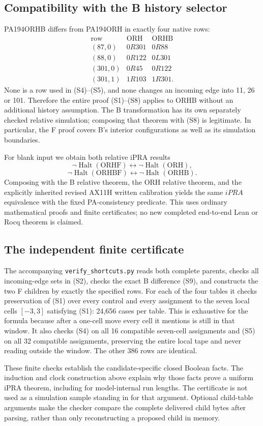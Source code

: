 \subsection{Compatibility with the B history selector}

PA194ORHB differs from PA194ORH in exactly four native rows:
\[
\begin{array}{c|c|c}
\text{row}&\text{ORH}&\text{ORHB}\\\hline
(87,0)&0R301&0R88\\
(88,0)&0R122&0L301\\
(301,0)&0R45&0R122\\
(301,1)&1R103&1R301.
\end{array}                                                    \tag{S9}
\]
None is a row used in (S4)--(S5), and none changes an incoming edge into
11, 26 or 101.  Therefore the entire proof (S1)--(S8) applies to ORHB
without an additional history assumption.  The B transformation has its
own separately checked relative simulation; composing that theorem with
(S8) is legitimate.  In particular, the F proof covers B's interior
configurations as well as its simulation boundaries.

For blank input we obtain both relative iPRA results
\[
 \neg\operatorname{Halt}(\mathrm{ORHF})
       \longleftrightarrow\neg\operatorname{Halt}(\mathrm{ORH}),
\]
\[
 \neg\operatorname{Halt}(\mathrm{ORHBF})
       \longleftrightarrow\neg\operatorname{Halt}(\mathrm{ORHB}).
\]
Composing with the B relative theorem, the ORH relative theorem, and the
explicitly inherited revised AX11H written calibration yields the same
$iPRA$ equivalence with the fixed PA-consistency predicate.  This uses
ordinary mathematical proofs and finite certificates; no new completed
end-to-end Lean or Rocq theorem is claimed.

\subsection{The independent finite certificate}

The accompanying \texttt{verify\_shortcuts.py} reads both complete parents,
checks all incoming-edge sets in (S2), checks the exact B difference (S9),
and constructs the two F children by exactly the specified rows.  For each
of the four tables it checks preservation of (S1) over every control and
every assignment to the seven local cells $[-3,3]$ satisfying (S1): 24,656
cases per table.  This is exhaustive for the formula because after a
one-cell move every cell it mentions is still in that window.  It also
checks (S4) on all 16 compatible seven-cell assignments and (S5) on all
32 compatible assignments, preserving the entire local tape and never
reading outside the window.  The other 386 rows are identical.

These finite checks establish the candidate-specific closed Boolean
facts.  The induction and clock construction above explain why those
facts prove a uniform iPRA theorem, including for model-internal run
lengths.  The certificate is not used as a simulation sample standing
in for that argument.  Optional child-table arguments make the checker
compare the complete delivered child bytes after parsing, rather than
only reconstructing a proposed child in memory.

